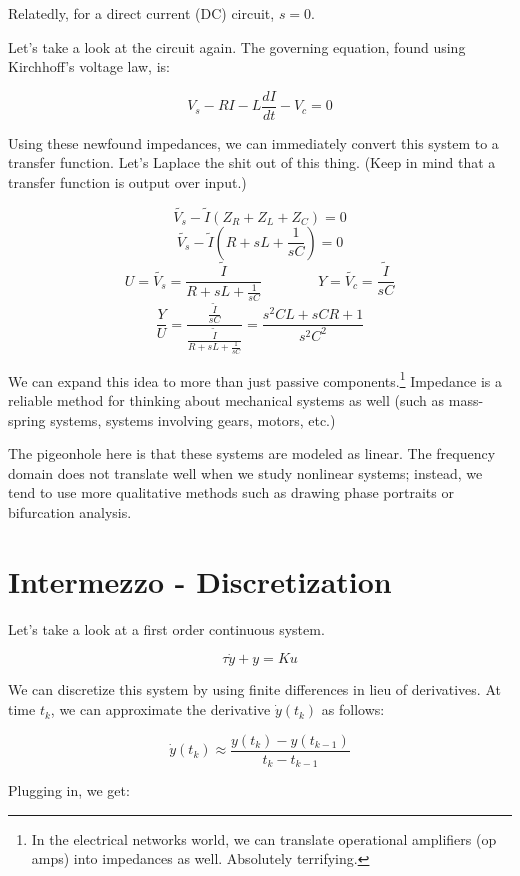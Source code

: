 \documentclass[
  letterpaper,
  DIV=11,
  numbers=noendperiod]{scrreprt}
\begin{document}
Relatedly, for a direct current (DC) circuit, \(s=0\).

Let's take a look at the circuit again. The governing equation, found
using Kirchhoff's voltage law, is:

\[V_s - RI - L \frac{dI}{dt} - V_c = 0\]

Using these newfound impedances, we can immediately convert this system
to a transfer function. Let's Laplace the shit out of this thing. (Keep
in mind that a transfer function is output over input.)

\[\tilde{V_s} - \tilde{I} (Z_R + Z_L + Z_C) = 0\]
\[\tilde{V_s} - \tilde{I} (R + sL + \frac{1}{sC}) = 0\]
\[U = \tilde{V_s} = \frac{\tilde{I}}{R + sL + \frac{1}{sC}}\qquad \qquad Y = \tilde{V_c} = \frac{\tilde{I}}{sC}\]
\[\frac{Y}{U} = \frac{\frac{\tilde{I}}{sC}}{\frac{\tilde{I}}{R + sL + \frac{1}{sC}}} = \frac{s^2 CL + sCR + 1}{s^2 C^2}\]

We can expand this idea to more than just passive components.\footnote{In
  the electrical networks world, we can translate operational amplifiers
  (op amps) into impedances as well. Absolutely terrifying.} Impedance
is a reliable method for thinking about mechanical systems as well (such
as mass-spring systems, systems involving gears, motors, etc.)

The pigeonhole here is that these systems are modeled as linear. The
frequency domain does not translate well when we study nonlinear
systems; instead, we tend to use more qualitative methods such as
drawing phase portraits or bifurcation analysis.

\hypertarget{intermezzo---discretization}{%
\section*{Intermezzo -
Discretization}\label{intermezzo---discretization}}


Let's take a look at a first order continuous system.

\[\tau \dot{y} + y = Ku\]

We can discretize this system by using finite differences in lieu of
derivatives. At time \(t_k\), we can approximate the derivative
\(\dot{y}(t_k)\) as follows:

\[\dot{y}(t_k) \approx \frac{y(t_k) - y(t_{k-1})}{t_k - t_{k-1}}\]

Plugging in, we get:
\end{document}
